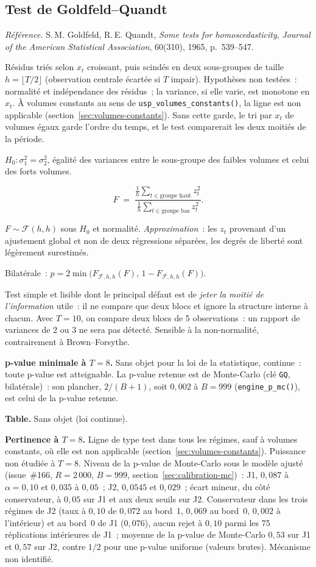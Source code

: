 \documentclass[a4paper,11pt]{article}
\newcommand{\code}[1]{\texttt{\small #1}}
\newcommand{\refl}[1]{{\small\textcolor{maincolor!70!black}{\textit{Référence.} #1}}\par\smallskip}
\newcounter{ficheid}
\newenvironment{fiche}[1]{%
  \stepcounter{ficheid}%
  \phantomsection
  \subsection{#1}%
  \label{fiche:\theficheid}%
}{%
  \end{description}\vspace{0.5em}%
}
\newcommand{\Cadre}{%
  \begin{description}[leftmargin=0pt, style=unboxed, itemsep=3pt, topsep=3pt, parsep=2pt]%
  \item[\textcolor{financeblue}{\textbf{1. Cadre, notations et hypothèses de validité (non testées).}}]}
\newcommand{\Hzero}{\item[\textcolor{financeblue}{\textbf{2. Hypothèse nulle.}}]}
\newcommand{\Stat}{\item[\textcolor{financeblue}{\textbf{3. Statistique de test.}}]}
\newcommand{\Loi}{\item[\textcolor{financeblue}{\textbf{4. Loi sous $H_0$.}}]}
\newcommand{\Pval}{\item[\textcolor{financeblue}{\textbf{5. p-value.}}]}
\newcommand{\Usage}{\item[\textcolor{financeblue}{\textbf{6. Usage et limites.}}]}
\newcommand{\Pertinence}{\item[\textcolor{financeblue}{\textbf{7. Pertinence et puissance à faible $T$.}}]}
\begin{document}
\begin{fiche}{Test de Goldfeld--Quandt}
\label{fiche:goldfeld-quandt}%
\refl{S.\,M. Goldfeld, R.\,E. Quandt, \emph{Some tests for homoscedasticity}, \emph{Journal of
the American Statistical Association}, 60(310), 1965, p.~539--547.}
\Cadre
Résidus triés selon $x_t$ croissant, puis scindés en deux sous-groupes de taille
$h = \lfloor T/2 \rfloor$ (observation centrale écartée si $T$ impair). Hypothèses non testées~:
normalité et indépendance des résidus~; la variance, si elle varie, est monotone en $x_t$.
À volumes constants au sens de \code{usp\_volumes\_constants()}, la ligne est non applicable
(section~\ref{sec:volumes-constants}). Sans cette garde, le tri par $x_t$ de volumes égaux garde l'ordre du temps, et le
test comparerait les deux moitiés de la période.
\Hzero
$H_0 : \sigma_1^2 = \sigma_2^2$, égalité des variances entre le sous-groupe des faibles volumes et
celui des forts volumes.
\Stat
\[
  F \;=\; \frac{\frac{1}{h}\sum_{t \in \text{groupe haut}} z_t^2}
               {\frac{1}{h}\sum_{t \in \text{groupe bas}} z_t^2}.
\]
\Loi
$F \sim \mathcal{F}(h, h)$ sous $H_0$ et normalité. \emph{Approximation}~: les $z_t$ provenant
d'un ajustement global et non de deux régressions séparées, les degrés de liberté sont légèrement
surestimés.
\Pval
Bilatérale~: $p = 2\min\big(F_{\mathcal{F},h,h}(F),\, 1 - F_{\mathcal{F},h,h}(F)\big)$.
\Usage
Test simple et lisible dont le principal défaut est de \emph{jeter la moitié de l'information}
utile~: il ne compare que deux blocs et ignore la structure interne à chacun. Avec $T = 10$, on
compare deux blocs de 5 observations~: un rapport de variances de 2 ou 3 ne sera pas détecté.
Sensible à la non-normalité, contrairement à Brown--Forsythe.
\Pertinence
\textbf{p-value minimale à $T = 8$.} Sans objet pour la loi de la statistique, continue~: toute p-value est atteignable. La p-value retenue est de Monte-Carlo (clé \code{GQ}, bilatérale)~: son plancher, $2/(B+1)$, soit $0{,}002$ à $B = 999$ (\code{engine\_p\_mc()}), est celui de la p-value retenue.

\textbf{Table.} Sans objet (loi continue).

\textbf{Pertinence à $T = 8$.} Ligne de type test dans tous les régimes, sauf à volumes constants, où elle est non applicable (section~\ref{sec:volumes-constants}). Puissance non étudiée à $T = 8$. Niveau de la p-value de Monte-Carlo sous le modèle ajusté (issue~\#166, $R = 2\,000$, $B = 999$, section~\ref{sec:calibration-mc})~: J1, $0{,}087$ à $\alpha = 0{,}10$ et $0{,}035$ à $0{,}05$~; J2, $0{,}0545$ et $0{,}029$~; écart mineur, du côté conservateur, à $0{,}05$ sur J1 et aux deux seuils sur J2. Conservateur dans les trois régimes de J2 (taux à $0{,}10$ de $0{,}072$ au bord~1, $0{,}069$ au bord~0, $0{,}002$ à l'intérieur) et au bord~0 de J1 ($0{,}076$), aucun rejet à $0{,}10$ parmi les 75 réplications intérieures de J1~; moyenne de la p-value de Monte-Carlo $0{,}53$ sur J1 et $0{,}57$ sur J2, contre $1/2$ pour une p-value uniforme (valeurs brutes). Mécanisme non identifié.


\end{fiche}
\end{document}
